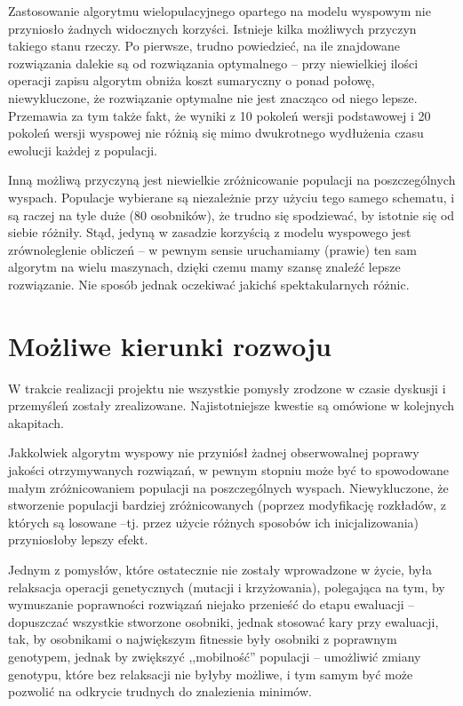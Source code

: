 \documentclass[11pt,pdftex,a4paper]{scrartcl}
\begin{document}
Zastosowanie algorytmu wielopulacyjnego opartego na modelu wyspowym nie przyniosło żadnych widocznych
korzyści. Istnieje kilka możliwych przyczyn takiego stanu rzeczy. Po pierwsze, trudno powiedzieć, na
ile znajdowane rozwiązania dalekie są od rozwiązania optymalnego -- przy niewielkiej ilości operacji
zapisu algorytm obniża koszt sumaryczny o ponad połowę, niewykluczone, że rozwiązanie optymalne nie
jest znacząco od niego lepsze. Przemawia za tym także fakt, że wyniki z 10 pokoleń wersji podstawowej
i 20 pokoleń wersji wyspowej nie różnią się mimo dwukrotnego wydłużenia czasu ewolucji każdej z
populacji.

Inną możliwą przyczyną jest niewielkie zróżnicowanie populacji na poszczególnych wyspach. Populacje
wybierane są niezależnie przy użyciu tego samego schematu, i są raczej na tyle duże (80 osobników),
że trudno się spodziewać, by istotnie się od siebie różniły. Stąd, jedyną w zasadzie korzyścią z modelu
wyspowego jest zrównoleglenie obliczeń -- w pewnym sensie uruchamiamy (prawie) ten sam algorytm
na wielu maszynach, dzięki czemu mamy szansę znaleźć lepsze rozwiązanie. Nie sposób jednak oczekiwać
jakichś spektakularnych różnic.


\section{Możliwe kierunki rozwoju}

W trakcie realizacji projektu nie wszystkie pomysły zrodzone w czasie dyskusji i przemyśleń zostały
zrealizowane. Najistotniejsze kwestie są omówione w kolejnych akapitach.

Jakkolwiek algorytm wyspowy nie przyniósł żadnej obserwowalnej poprawy jakości otrzymywanych rozwiązań,
w pewnym stopniu może być to spowodowane małym zróżnicowaniem populacji na poszczególnych wyspach.
Niewykluczone, że stworzenie populacji bardziej zróżnicowanych (poprzez modyfikację rozkładów, z których
są losowane --tj. przez użycie różnych sposobów ich inicjalizowania) przyniosłoby lepszy efekt.

Jednym z pomysłów, które ostatecznie nie zostały wprowadzone w życie, była relaksacja operacji
genetycznych (mutacji i krzyżowania), polegająca na tym, by wymuszanie poprawności rozwiązań niejako
przenieść do etapu ewaluacji -- dopuszczać wszystkie stworzone osobniki, jednak stosować kary przy
ewaluacji, tak, by osobnikami o największym fitnessie były osobniki z poprawnym genotypem, jednak by
zwiększyć ,,mobilność'' populacji -- umożliwić zmiany genotypu, które bez relaksacji nie byłyby 
możliwe, i tym samym być może pozwolić na odkrycie trudnych do znalezienia minimów.
\end{document}
